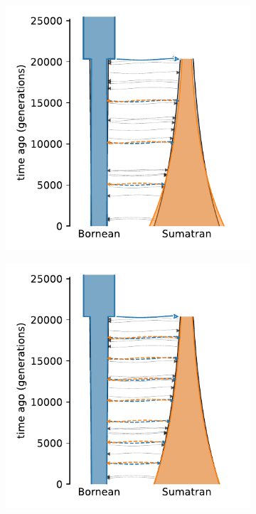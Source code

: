 \begin{figure}[ht]
\begin{subfigure}[b]{0.24\linewidth}
        \caption{}
    \end{subfigure}%
    \begin{subfigure}[b]{0.24\linewidth}
        \centering
        \includegraphics[width=\textwidth]{images_experiments/suimulation_2_stdpopsim/ORAN-PULSE/oran-pulse-3.pdf}
        \caption{}
    \end{subfigure}%
    \begin{subfigure}[b]{0.24\linewidth}
        \centering
        \includegraphics[width=\textwidth]{images_experiments/suimulation_2_stdpopsim/ORAN-PULSE/oran-pulse-7.pdf}

\end{subfigure}
\end{figure}
